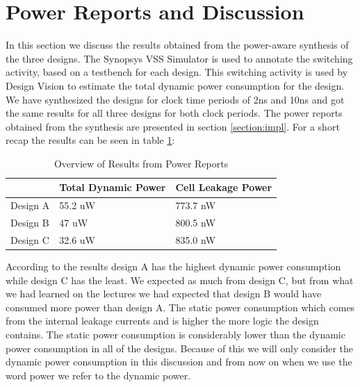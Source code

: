 \documentclass[11pt,a4paper]{article}
\begin{document}
\newpage
\section{Power Reports and Discussion}
\label{section:power}

In this section we discuss the results obtained from the power-aware synthesis of the three designs. The Synopsys VSS Simulator is used to annotate the switching activity, based on a testbench for each design. This switching activity is used by Design Vision to estimate the total dynamic power consumption for the design. We have synthesized the designs for clock time periods of 2ns and 10ns and got the same results for all three designs for both clock periods. The power reports obtained from the synthesis are presented in section \ref{section:impl}. For a short recap the results can be seen in table \ref{table:power}:


\begin{table}[htbp]
\begin{center}
\begin{tabular}{|l|l|l|}
\hline
\textbf{}	& \textbf{Total Dynamic Power}		& \textbf{Cell Leakage Power}\\ \hline
Design A &	55.2 uW				& 773.7 nW \\ \hline
Design B &	47 uW					& 800.5 nW \\ \hline
Design C &  32.6 uW				& 835.0 nW \\ \hline
\end{tabular}
\end{center}
\caption{Overview of Results from Power Reports}
\label{table:power}
\end{table}

According to the results design A has the highest dynamic power consumption while design C has the least. We expected as much from design C, but from what we had learned on the lectures we had expected that design B would have consumed more power than design A. The static power consumption which comes from the internal leakage currents and is higher the more logic the design contains. The static power consumption is considerably lower than the dynamic power consumption in all of the designs. Because of this we will only consider the dynamic power consumption in this discussion and from now on when we use the word power we refer to the dynamic power.
\end{document}
